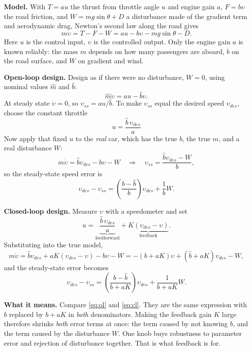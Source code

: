 \documentclass[11pt,a4paper]{article}
\begin{document}
\begin{workedex}[title=Worked example 2.1 --- open- versus closed-loop cruise control]
\textbf{Model.} With $T=au$ the thrust from throttle angle $u$ and engine gain
$a$, $F=b\upsilon$ the road friction, and
$W=mg\sin\theta+D$ a disturbance made of the gradient term and aerodynamic
drag, Newton's second law along the road gives
\[
  m\dot{\upsilon}=T-F-W=au-b\upsilon-mg\sin\theta-D .
\]
Here $u$ is the control input, $\upsilon$ is the controlled output. Only the
engine gain $a$ is known reliably: the mass $m$ depends on how many passengers
are aboard, $b$ on the road surface, and $W$ on gradient and wind.

\medskip
\textbf{Open-loop design.} Design as if there were no disturbance, $W=0$, using
nominal values $\hat m$ and $\hat b$:
\[
  \hat m \dot\upsilon = au-\hat b \upsilon .
\]
At steady state $\dot\upsilon=0$, so $\upsilon_{ss}=au/\hat b$. To make
$\upsilon_{ss}$ equal the desired speed $\upsilon_{des}$, choose the constant
throttle
\[
  \boxed{\;u=\frac{\hat b\,\upsilon_{des}}{a}\;}
\]
Now apply that fixed $u$ to the \emph{real} car, which has the true $b$, the
true $m$, and a real disturbance $W$:
\[
  m\dot\upsilon = \hat b \upsilon_{des}-b\upsilon-W
  \quad\Longrightarrow\quad
  \upsilon_{ss}=\frac{\hat b\upsilon_{des}-W}{b},
\]
so the steady-state speed error is
\begin{equation}
  \upsilon_{des}-\upsilon_{ss}
  =\left(\frac{b-\hat b}{b}\right)\upsilon_{des}+\frac{1}{b}W .
  \label{eq:ol}
\end{equation}

\medskip
\textbf{Closed-loop design.} Measure $\upsilon$ with a speedometer and set
\begin{equation}
  u=\underbrace{\frac{\hat b\,\upsilon_{des}}{a}}_{\text{feedforward}}
   +\underbrace{K(\upsilon_{des}-\upsilon)}_{\text{feedback}} .
  \label{eq:cl-law}
\end{equation}
Substituting into the true model,
\[
  m\dot\upsilon=\hat b\upsilon_{des}+aK(\upsilon_{des}-\upsilon)-b\upsilon-W
   =-(b+aK)\upsilon+(\hat b+aK)\upsilon_{des}-W,
\]
and the steady-state error becomes
\begin{equation}
  \upsilon_{des}-\upsilon_{ss}
  =\left(\frac{b-\hat b}{b+aK}\right)\upsilon_{des}+\frac{1}{b+aK}W .
  \label{eq:cl}
\end{equation}

\medskip
\textbf{What it means.} Compare \eqref{eq:ol} and \eqref{eq:cl}. They are the
same expression with $b$ replaced by $b+aK$ in \emph{both} denominators. Making
the feedback gain $K$ large therefore shrinks \emph{both} error terms at once:
the term caused by not knowing $b$, and the term caused by the disturbance $W$.
One knob buys robustness to parameter error and rejection of disturbance
together. That is what feedback is for.
\end{workedex}
\end{document}
